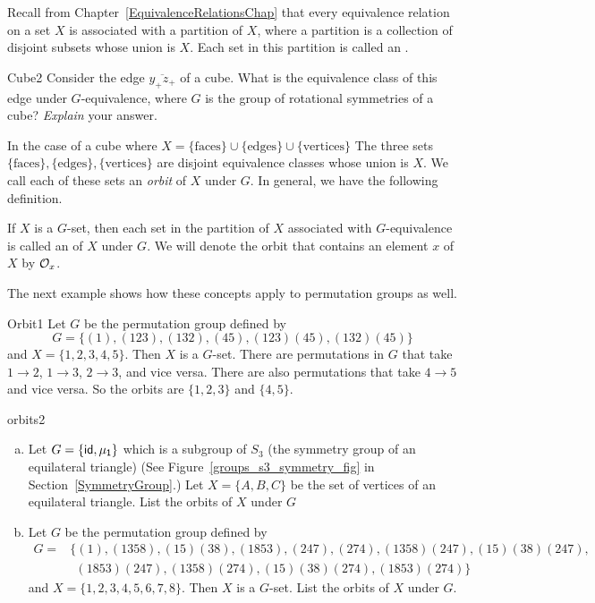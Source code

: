 Recall from Chapter~\ref{EquivalenceRelationsChap} that every equivalence relation on a set $X$ is associated with a partition of $X$, where a partition is a collection of disjoint subsets whose union is $X$. Each set in this partition is called an .

\begin{exercise}{Cube2}
Consider the edge $\overline{y_+z_+}$ of a cube.  What is the equivalence class of this edge under $G$-equivalence, where $G$ is the group of rotational symmetries of a cube? \emph{Explain} your answer.
\end {exercise}

In the case of a cube where $X=\{\text{faces}\}\cup\{\text{edges}\}\cup\{\text{vertices}\}$ The three sets $\{\text{faces}\},\{\text{edges}\},\{\text{vertices}\}$ are disjoint equivalence classes whose union is $X$. We call each of these sets an \emph{orbit} of $X$ under $G$.  In general, we have the following definition.

\begin{defn} \label{noteorbit}
If $X$ is a $G$-set, then each set in the partition of $X$ associated with
$G$-equivalence is called an  of $X$ under $G$. We will denote the orbit that contains an element $x$ of $X$ by
${\cal O}_x$. 
\end {defn}
The next example shows how these concepts apply to permutation groups as well.

\begin{example}{Orbit1}
Let $G$ be the permutation group defined by
\[
G =\{(1), (1 23), (1 3 2), (4 5), (1 2 3)(4 5), (1 3 2)(4 5) \}
\]
and $X = \{ 1, 2, 3, 4, 5\}$. Then $X$ is a $G$-set. There are permutations in $G$ that take $1\rightarrow2$, $1\rightarrow3$, $2\rightarrow3$, and vice versa. There are also permutations that take $4\rightarrow 5$ and vice versa.  So the orbits are $\{1, 2, 3\}$ and $\{4, 5\}$. 
\end{example} 
 
\begin{exercise}{orbits2}
\begin{enumerate}[(a)]
\item Let $G=\{\sf{id},\mu_1\}$ which is a subgroup of $S_3$ (the symmetry group of an equilateral triangle) (See Figure~\ref{groups_s3_symmetry_fig} in Section~\ref{SymmetryGroup}.) Let $X=\{A,B,C\}$ be the set of vertices of an equilateral triangle. List the orbits of $X$ under $G$
\item Let $G$ be the permutation group defined by
\begin{align*}
G =&\{(1), (1358),(15)(38), (1853), (247),(274), (1358)(247),(15)(38)(247),\\
&~~ (1853)(247),(1358)(274),(15)(38)(274),(1853)(274) \}
\end{align*}
and $X = \{ 1, 2, 3, 4, 5,6,7,8\}$. Then $X$ is a $G$-set.  List the orbits of $X$ under $G$.
\end{enumerate}
\end {exercise}


